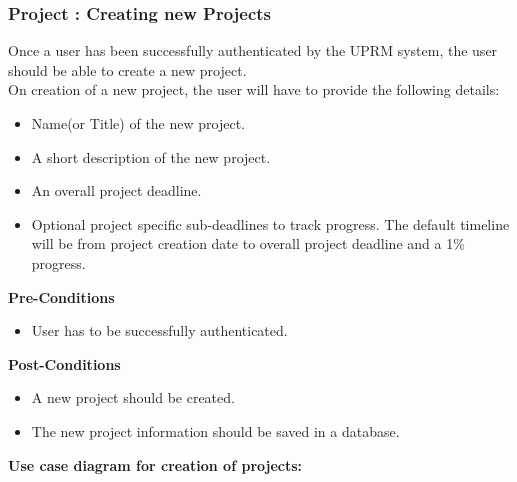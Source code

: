 \subsubsection{Project : Creating new Projects}
	Once a user has been successfully authenticated by the UPRM system, the user should be able to create a new project.\\ On creation of a new project, the user will have to provide the following details:
	\begin{itemize}
		\item Name(or Title) of the new project.
		\item A short description of the new project.
		\item An overall project deadline.
		\item Optional project specific sub-deadlines to track progress. The default timeline will be from project creation date to overall project deadline and a 1\% progress.\\
	\end{itemize}
	\textbf{Pre-Conditions}
	\begin{itemize}
		\item User has to be successfully authenticated.\\
	\end{itemize}
	\textbf{Post-Conditions}
	\begin{itemize}
		\item A new project should be created.
		\item The new project information should be saved in a database.\\
	\end{itemize}
	\textbf{Use case diagram for creation of projects: }\\
	\centerline{}
	
